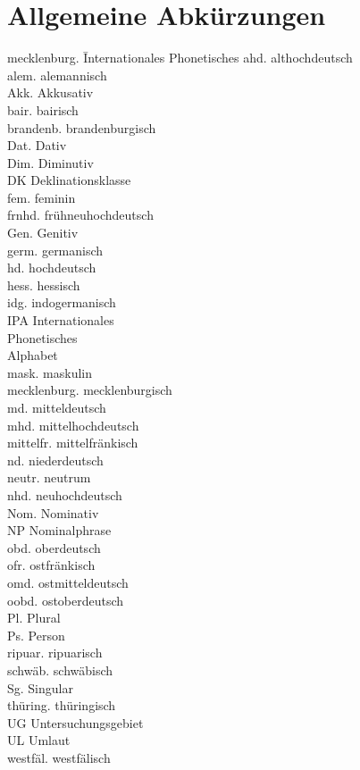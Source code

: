 \addchap{\lsAbbreviationsTitle}

\section*{Allgemeine Abkürzungen}
\begin{multicols}{2}
\begin{tabbing}
mecklenburg. \= Internationales Phonetisches\kill
ahd. \>   althochdeutsch\\
alem. \>   alemannisch\\
Akk. \>   Akkusativ\\
bair. \>   bairisch\\
brandenb. \>  brandenburgisch\\
Dat. \>   Dativ\\
Dim. \>   Diminutiv\\
DK \>   Deklinationsklasse\\
fem. \>    feminin\\
frnhd. \>   frühneuhochdeutsch\\
Gen.  \>  Genitiv\\
germ. \>   germanisch\\
hd. \>   hochdeutsch\\
hess. \>   hessisch\\
idg. \>   indogermanisch\\
IPA \>   Internationales \\ \> Phonetisches \\ \> Alphabet\\
mask. \>    maskulin\\
mecklenburg. \> mecklenburgisch\\
md.  \>  mitteldeutsch\\
mhd. \>    mittelhochdeutsch\\
mittelfr. \> mittelfränkisch\\
nd. \>   niederdeutsch\\
neutr. \>    neutrum\\
nhd. \>    neuhochdeutsch\\
Nom. \>   Nominativ\\
NP  \>   Nominalphrase\\
obd. \>   oberdeutsch\\
ofr. \>    ostfränkisch\\
omd. \>    ostmitteldeutsch\\
oobd. \>   ostoberdeutsch\\
Pl. \>   Plural\\
Ps. \>   Person\\
ripuar. \>   ripuarisch\\
schwäb. \> schwäbisch\\
Sg. \>   Singular\\
thüring. \>  thüringisch\\
UG  \>  Untersuchungsgebiet\\
UL  \>   Umlaut\\
westfäl. \> westfälisch
\end{tabbing}
\end{multicols}

